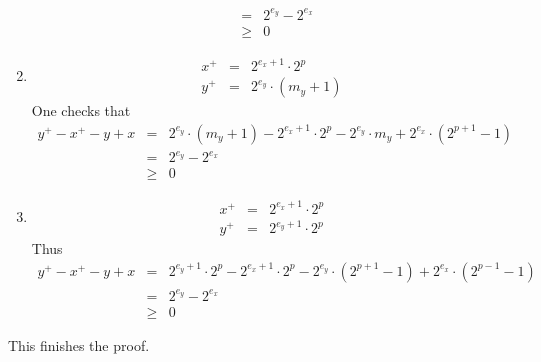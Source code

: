 \documentclass[a4paper,10pt,twoside]{article}
\newenvironment{proof}[1][Proof]{\begin{trivlist}
\item[\hskip \labelsep {\bfseries #1}]}{\end{trivlist}}
\newcommand{\qed}{\nobreak \ifvmode \relax \else \ifdim \lastskip<1.5em \hskip-\lastskip
\hskip1.5em plus0em minus0.5em \fi \nobreak \vrule height0.75em width0.5em depth0.25em\fi}
\begin{document}
\begin{proof}
\begin{enumerate}
\begin{eqnarray*}
& = & 2^{e_y} - 2^{e_x} \\
& \geq & 0
\end{eqnarray*}
\item \begin{eqnarray*}
x^+ & = & 2^{e_x+1} \cdot 2^p \\
y^+ & = & 2^{e_y} \cdot \left( m_y  + 1 \right)
\end{eqnarray*}
One checks that
\begin{eqnarray*}
y^+ - x^+ - y + x & = & 2^{e_y} \cdot \left( m_y + 1 \right) - 2^{e_x+1} \cdot 2^p - 2^{e_y} \cdot m_y + 2^{e_x} \cdot \left( 2^{p+1} - 1 \right) \\
& = & 2^{e_y} - 2^{e_x} \\
& \geq & 0
\end{eqnarray*}
\item \begin{eqnarray*}
x^+ & = & 2^{e_x+1} \cdot 2^p \\
y^+ & = & 2^{e_y+1} \cdot 2^p
\end{eqnarray*}
Thus
\begin{eqnarray*}
y^+ - x^+ - y + x & = & 2^{e_y+1} \cdot 2^p - 2^{e_x+1} \cdot 2^p - 2^{e_y} \cdot \left( 2^{p+1} - 1 \right) + 2^{e_x} \cdot \left( 2^{p-1} - 1\right) \\
& = & 2^{e_y} - 2^{e_x} \\
& \geq & 0
\end{eqnarray*}
\end{enumerate}
This finishes the proof.\qed
\end{proof}
\end{document}
